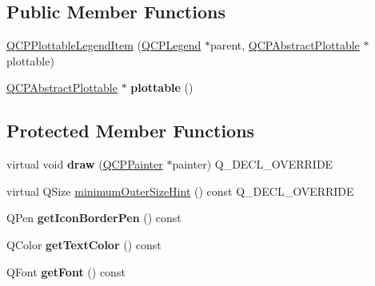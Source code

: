 \subsection*{Public Member Functions}
\begin{DoxyCompactItemize}
\item 
\hyperlink{classQCPPlottableLegendItem_ac1072591fe409d3dabad51b23ee4d6c5}{Q\+C\+P\+Plottable\+Legend\+Item} (\hyperlink{classQCPLegend}{Q\+C\+P\+Legend} $\ast$parent, \hyperlink{classQCPAbstractPlottable}{Q\+C\+P\+Abstract\+Plottable} $\ast$plottable)
\item 
\hyperlink{classQCPAbstractPlottable}{Q\+C\+P\+Abstract\+Plottable} $\ast$ {\bfseries plottable} ()\hypertarget{classQCPPlottableLegendItem_af29e9a2c60b4cba0cac2447b8af7b488}{}\label{classQCPPlottableLegendItem_af29e9a2c60b4cba0cac2447b8af7b488}

\end{DoxyCompactItemize}
\subsection*{Protected Member Functions}
\begin{DoxyCompactItemize}
\item 
virtual void {\bfseries draw} (\hyperlink{classQCPPainter}{Q\+C\+P\+Painter} $\ast$painter) Q\+\_\+\+D\+E\+C\+L\+\_\+\+O\+V\+E\+R\+R\+I\+DE\hypertarget{classQCPPlottableLegendItem_a5838366619200e99680afa6d355d13fa}{}\label{classQCPPlottableLegendItem_a5838366619200e99680afa6d355d13fa}

\item 
virtual Q\+Size \hyperlink{classQCPPlottableLegendItem_a8b543f3ac32b2fe59326e01c1101b3b8}{minimum\+Outer\+Size\+Hint} () const Q\+\_\+\+D\+E\+C\+L\+\_\+\+O\+V\+E\+R\+R\+I\+DE
\item 
Q\+Pen {\bfseries get\+Icon\+Border\+Pen} () const \hypertarget{classQCPPlottableLegendItem_ab36270e6b022a6961fa44136f35c0e4b}{}\label{classQCPPlottableLegendItem_ab36270e6b022a6961fa44136f35c0e4b}

\item 
Q\+Color {\bfseries get\+Text\+Color} () const \hypertarget{classQCPPlottableLegendItem_ad762b07439c738660ba93e78c1d03667}{}\label{classQCPPlottableLegendItem_ad762b07439c738660ba93e78c1d03667}

\item 
Q\+Font {\bfseries get\+Font} () const \hypertarget{classQCPPlottableLegendItem_a8a85c8a25affb4895423d730164d61de}{}\label{classQCPPlottableLegendItem_a8a85c8a25affb4895423d730164d61de}

\end{DoxyCompactItemize}
